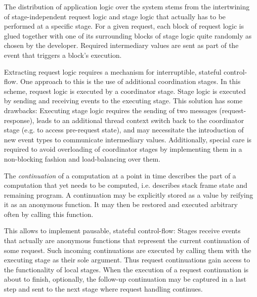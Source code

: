 \documentclass{sig-alternate}
\begin{document}
The distribution of application logic over the system stems from the intertwining of
stage-independent request logic and stage logic that actually has to be performed at a specific
stage. For a given request, each block of request logic is glued together with one of its
surrounding blocks of stage logic quite randomly as chosen by the developer. Required intermediary
values are sent as part of the event that triggers a block's execution.


Extracting request logic requires a mechanism for interruptible, stateful control-flow. One approach
to this is the use of additional coordination stages. In this scheme, request logic is executed by a
coordinator stage. Stage logic is executed by sending and receiving events to the executing stage.
This solution has some drawbacks: Executing stage logic requires the sending of two messages
(request-response), leads to an additional thread context switch back to the coordinator stage (e.g.
to access pre-request state), and may necessitate the introduction of new event types to communicate
intermediary values. Additionally, special care is required to avoid overloading of coordinator
stages by implementing them in a non-blocking fashion and load-balancing over them.

The \emph{continuation} of a computation at a point in time describes the part of a computation that
yet needs to be computed, i.e. describes stack frame state and remaining program. A continuation may
be explicitly stored as a value by reifying it as an anonymous function. It may then be restored and
executed arbitrary often by calling this function.

This allows to implement pausable, stateful control-flow: Stages receive events that actually are
anonymous functions that represent the current continuation of some request. Such incoming
continuations are executed by calling them with the executing stage as their sole argument. Thus
request continuations gain access to the functionality of local stages. When the execution of a
request continuation is about to finish, optionally, the follow-up continuation may be captured in a
last step and sent to the next stage where request handling continues.
\end{document}
